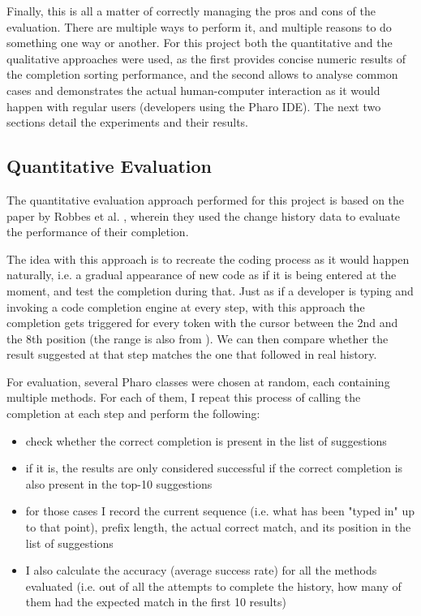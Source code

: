 \documentclass[sigplan,screen]{acmart}
\begin{document}
Finally, this is all a matter of correctly managing the pros and cons of the evaluation. There are multiple ways to perform it, and multiple reasons to do something one way or another. For this project both the quantitative and the qualitative approaches were used, as the first provides concise numeric results of the completion sorting performance, and the second allows to analyse common cases and demonstrates the actual human-computer interaction as it would happen with regular users (developers using the Pharo IDE). The next two sections detail the experiments and their results.

\subsection{Quantitative Evaluation}
The quantitative evaluation approach performed for this project is based on the paper by Robbes et al. \cite{Robb08a}, wherein they used the change history data to evaluate the performance of their completion.

The idea with this approach is to recreate the coding process as it would happen naturally, i.e. a gradual appearance of new code as if it is being entered at the moment, and test the completion during that. Just as if a developer is typing and invoking a code completion engine at every step, with this approach the completion gets triggered for every token with the cursor between the 2nd and the 8th position (the range is also from \cite{Robb08a}). We can then compare whether the result suggested at that step matches the one that followed in real history.

For evaluation, several Pharo classes were chosen at random, each containing multiple methods. For each of them, I repeat this process of calling the completion at each step and perform the following:
\begin{itemize}
    \item check whether the correct completion is present in the list of suggestions
    \item if it is, the results are only considered successful if the correct completion is also present in the top-10 suggestions
    \item for those cases I record the current sequence (i.e. what has been "typed in" up to that point), prefix length, the actual correct match, and its position in the list of suggestions
    \item I also calculate the accuracy (average success rate) for all the methods evaluated (i.e. out of all the attempts to complete the history, how many of them had the expected match in the first 10 results)
\end{itemize}
\end{document}
